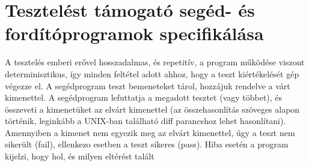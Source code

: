 \section{Tesztelést támogató segéd- és fordítóprogramok specifikálása}
A tesztelés emberi erővel hosszadalmas, és repetitív, a program működése viszont determinisztikus, így minden
feltétel adott ahhoz, hogy a teszt kiértékelését gép végezze el. A segédprogram teszt bemeneteket tárol, hozzájuk rendelve
a várt kimenettel. A segédprogram lefuttatja a megadott tesztet (vagy többet), és összeveti a kimenetüket
az elvárt kimenettel (az összehasonlítás szöveges alapon történik, leginkább a UNIX-ban található diff parancshoz
lehet hasonlítani). Amennyiben a kimenet nem egyezik meg az elvárt kimenettel, úgy a teszt nem sikerült
(fail), ellenkezo esetben a teszt sikeres (pass). Hiba esetén a program kijelzi, hogy hol, és milyen eltérést talált

